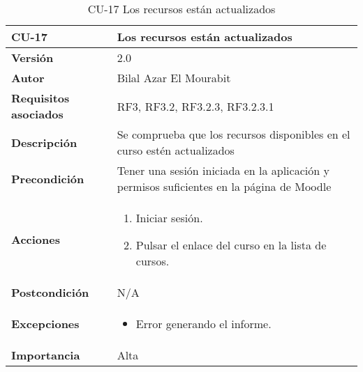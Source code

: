 \begin{table}[H]
	\centering
	\begin{tabularx}{\linewidth}{ p{} p{} }
		\toprule
		\textbf{CU-17}    & \textbf{Los recursos están actualizados}\\
		\toprule
		\textbf{Versión}              & 2.0   \\
		\textbf{Autor}                & Bilal Azar El Mourabit \\
		\textbf{Requisitos asociados} & RF3, RF3.2, RF3.2.3, RF3.2.3.1 \\
		\textbf{Descripción}          & Se comprueba que los recursos disponibles en el curso estén actualizados\\
    		\textbf{Precondición}         & Tener una sesión iniciada en la aplicación y permisos suficientes en la página de Moodle\\
		\textbf{Acciones}             & 
		\begin{enumerate}
			\def\labelenumi{\arabic{enumi}.}
			\tightlist
			\item Iniciar sesión.
            \item Pulsar el enlace del curso en la lista de cursos. 
		\end{enumerate}\\
		\textbf{Postcondición}        & N/A \\
		\textbf{Excepciones}          & \begin{itemize}
		    \item Error generando el informe.
		\end{itemize} \\
		\textbf{Importancia}          & Alta \\
		\bottomrule
	\end{tabularx}
	\caption{CU-17  Los recursos están actualizados}
\end{table}

